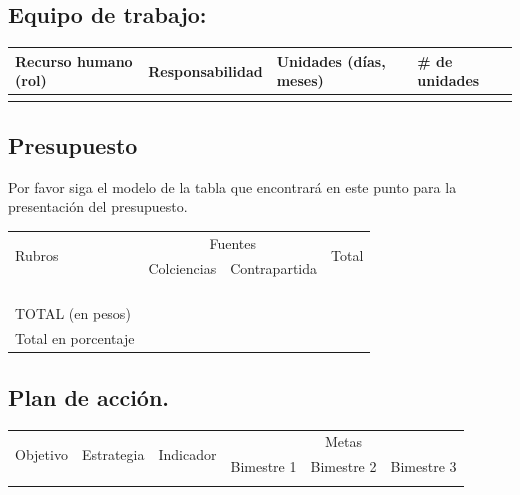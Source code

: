 \subsection{Equipo de trabajo:}
\begin{tabular}{|l|l|l|l|}\hline
Recurso humano (rol)& Responsabilidad& Unidades (días, meses)& \# de unidades\\\hline
&&&\\\hline
\end{tabular}

\subsection{Presupuesto}
\begin{instrucciones}
  Por favor siga el modelo de la tabla que encontrará en este punto para la presentación del presupuesto.
\end{instrucciones}
\begin{tabular}{|l|l|l|l|}\hline
  \multirow{2}{*}{Rubros}&\multicolumn{2}{c}{Fuentes}\vline&\multirow{2}{*}{Total}\\
  \cline{2-3} & Colciencias & Contrapartida & \\\hline 
 & & &\\\hline
 & & &\\\hline
 & & &\\\hline
 & & &\\\hline
TOTAL (en pesos) & & &\\\hline
Total en porcentaje & & &\\\hline
\end{tabular}

\subsection{Plan de acción.}
\begin{tabular}{|l|l|l|l|l|l|}\hline
  \multirow{2}{*}{Objetivo} & \multirow{2}{*}{Estrategia} & \multirow{2}{*}{Indicador}  & \multicolumn{3}{|c|}{Metas}\\
\cline{4-6} 
& & & Bimestre 1 &Bimestre 2 & Bimestre 3\\\hline 
&&&&&\\\hline
\end{tabular}



